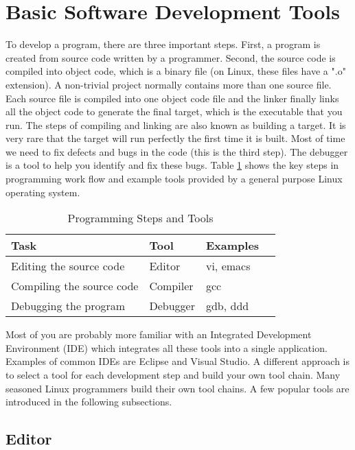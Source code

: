 \section{Basic Software Development Tools}

To develop a program, there are three important steps.
First, a program is created from source code written by a programmer. Second, the source code is compiled into object code, which is a binary file (on Linux, these files have a ".o" extension). A non-trivial project normally contains more than one source file. Each source file is compiled into one object code file and the linker finally links all the object code to generate the final target, which is the executable that you run. The steps of compiling and linking are also known as building a target. It is very rare that the target will run perfectly the first time it is built. Most of time we need to fix defects and bugs in the code (this is the third step). The debugger is a tool to help you identify and fix these bugs. Table \ref{tb_prog_tools} shows the key steps in programming work flow and example tools provided by a general purpose Linux operating system.

\begin{table}[ht]
\begin{center}
\begin{tabular}{llll}
\hline
Task & Tool & Examples\\ \hline
Editing the source code &    Editor & vi, emacs \\  
Compiling the source code &  Compiler & gcc \\ 
Debugging the program	  &  Debugger & gdb, ddd \\ \hline 
\end{tabular}
\caption{Programming Steps and Tools}
\label{tb_prog_tools}
\end{center}
\end{table}

Most of you are probably more familiar with an Integrated Development Environment (IDE) which integrates all these tools into a single application. Examples of common IDEs are Eclipse and Visual Studio. A different approach is to select a tool for each development step and build your own tool chain. Many seasoned Linux programmers build their own tool chains. A few popular tools are introduced in the following subsections.

\subsection{Editor}


